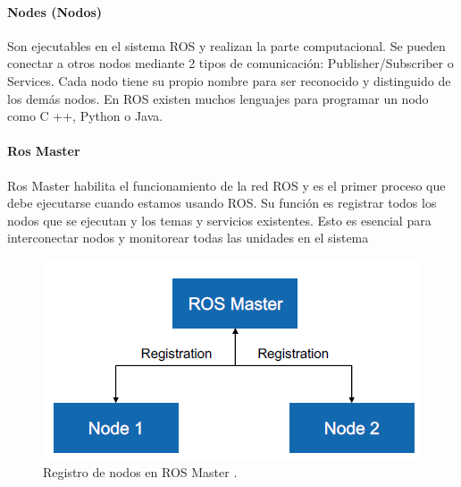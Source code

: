             \paragraph{Nodes (Nodos)}
                   Son ejecutables en el sistema ROS y realizan la parte computacional. Se pueden conectar a otros nodos mediante 2 tipos de comunicación: Publisher/Subscriber o Services. Cada nodo tiene su propio nombre para ser reconocido y distinguido de los demás nodos. En ROS existen muchos lenguajes para programar un nodo como C ++, Python o Java. 
                   
            \paragraph{Ros Master}
                    Ros Master habilita el funcionamiento de la red ROS y es el primer proceso que debe ejecutarse cuando estamos usando ROS. Su función es registrar todos los nodos que se ejecutan y los temas y servicios existentes. Esto es esencial para interconectar nodos y monitorear todas las unidades en el sistema
            \begin{figure}[htb]
                \centering
                \includegraphics[width=0.55\linewidth]{Main/Chapter3/Images3/n_s_a_6.png}
                \caption{Registro de nodos en ROS Master \cite{rosmaster_diagram}.}
                \label{f:Cap3_conceptos_6}
            \end{figure} 
            
            
               \newpage


